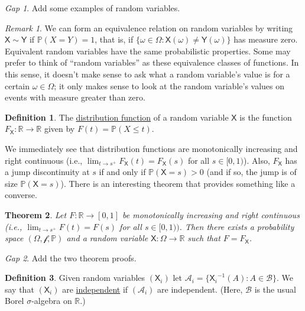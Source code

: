 \documentclass[11pt]{article}
\newcommand{\col}[1]{\mathscr{#1}}
\newcommand{\rv}[1]{\mathsf{#1}}
\newcommand{\p}{\mathbb{P}}
\newcommand{\bor}{\col{B}}
\newcommand{\defname}[1]{\underline{#1}}
\newcommand{\RR}{\mathbb{R}}
\theoremstyle{theorem}
\newtheorem{theorem}{Theorem}[section]
\theoremstyle{definition}
\newtheorem{definition}[theorem]{Definition}
\theoremstyle{remark}
\newtheorem*{remark}{Remark}
\theoremstyle{step}
\theoremstyle{gap}
\newtheorem*{gap}{Gap}
\begin{document}
\begin{gap}
Add some examples of random variables.
\end{gap}

\begin{remark}
We can form an equivalence relation on random variables by writing \(\rv{X} \sim \rv{Y}\) if \(\p(X=Y)=1\), that is, if \(\{\omega \in \Omega : \rv{X}(\omega) \neq \rv{Y}(\omega)\}\) has measure zero. Equivalent random variables have the same probabilistic properties. Some may prefer to think of ``random variables'' as these equivalence classes of functions. In this sense, it doesn't make sense to ask what a random variable's value is for a certain \(\omega \in \Omega\); it only makes sense to look at the random variable's values on events with measure greater than zero.
\end{remark}

\begin{definition}
The \defname{distribution function} of a random variable \(\rv{X}\) is the function \(F_\rv{X}: \RR \to \RR\) given by \(F(t) = \p(X \leq t)\).
\end{definition}

We immediately see that distribution functions are monotonically increasing and right continuous (i.e., \(\lim_{t\to s^+} F_\rv{X}(t) = F_\rv{X}(s)\) for all \(s \in [0,1)\)). Also, \(F_\rv{X}\) has a jump discontinuity at \(s\) if and only if \(\p(\rv{X} = s) > 0\) (and if so, the jump is of size \(\p(\rv{X} = s)\)). There is an interesting theorem that provides something like a converse.

\begin{theorem}
Let \(F:\RR \to [0,1]\) be monotonically increasing and right continuous (i.e., \(\lim_{t\to s^+} F(t) = F(s)\) for all \(s \in [0,1))\). Then there exists a probability space \((\Omega, \col{f}, \p)\) and a random variable \(\rv{X}:\Omega \to \RR\) such that \(F = F_\rv{X}\).
\end{theorem}

\begin{gap}
Add the two theorem proofs.
\end{gap}

\begin{definition}
Given random variables \((\rv{X}_i)\) let \(\col{A}_i = \{{\rv{X}_i}^{-1}(A) : A \in \bor\}\). We say that \((\rv{X}_i)\) are \defname{independent} if \((\col{A}_i)\) are independent. (Here, \(\bor\) is the usual Borel \(\sigma\)-algebra on \(\RR\).)
\end{definition}
\end{document}
